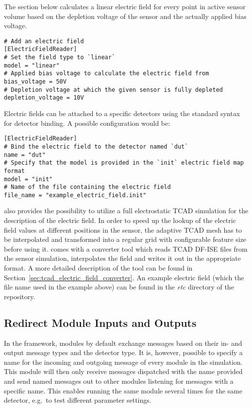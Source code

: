 The section below calculates a linear electric field for every point in active sensor volume based on the depletion voltage of the sensor and the actually applied bias voltage.
\begin{verbatim}
# Add an electric field
[ElectricFieldReader]
# Set the field type to `linear`
model = "linear"
# Applied bias voltage to calculate the electric field from
bias_voltage = 50V
# Depletion voltage at which the given sensor is fully depleted
depletion_voltage = 10V
\end{verbatim}

Electric fields can be attached to a specific detectors using the standard syntax for detector binding.
A possible configuration would be:
\begin{verbatim}
[ElectricFieldReader]
# Bind the electric field to the detector named `dut`
name = "dut"
# Specify that the model is provided in the `init` electric field map format
model = "init"
# Name of the file containing the electric field
file_name = "example_electric_field.init"
\end{verbatim}


\apsq also provides the possibility to utilize a full electrostatic TCAD simulation for the description of the electric field.
In order to speed up the lookup of the electric field values at different positions in the sensor, the adaptive TCAD mesh has to be interpolated and transformed into a regular grid with configurable feature size before using it.
\apsq comes with a converter tool which reads TCAD DF-ISE files from the sensor simulation, interpolates the field and writes it out in the appropriate format.
A more detailed description of the tool can be found in Section~\ref{sec:tcad_electric_field_converter}.
An example electric field (which the file name used in the example above) can be found in the \textit{etc} directory of the \apsq repository.


\subsection{Redirect Module Inputs and Outputs}
\label{sec:redirect_module_input_outputs}
In the \apsq framework, modules by default exchange messages based on their in- and output message types and the detector type.
It is, however, possible to specify a name for the incoming and outgoing message of every module in the simulation.
This module will then only receive messages dispatched with the name provided and send named messages out to other modules listening for messages with a specific name.
This enables running the same module several times for the same detector, e.g.\ to test different parameter settings.

